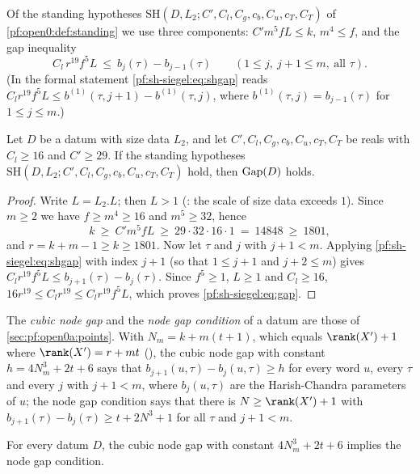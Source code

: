 Of the standing hypotheses $\mathrm{SH}(D,L_2;C',C_l,C_g,c_b,C_u,c_T,C_T)$ of \cref{pf:open0:def:standing} we use three
components: $C'm^5fL\le k$, $m^4\le f$, and the gap inequality
\begin{equation}\label{pf:sh-siegel:eq:shgap}
C_l\,r^{19}f^5L\ \le\ b_{j}(\tau)-b_{j-1}(\tau)\qquad(1\le j,\ j+1\le m,\ \text{all }\tau).
\end{equation}
(In the formal statement \eqref{pf:sh-siegel:eq:shgap} reads $C_lr^{19}f^5L\le b^{(1)}(\tau,j+1)-b^{(1)}(\tau,j)$, where
$b^{(1)}(\tau,j)=b_{j-1}(\tau)$ for $1\le j\le m$.)

\begin{proposition}\label{pf:sh-siegel:gaphyp}
Let $D$ be a datum with size data $L_2$, and let $C',C_l,C_g,c_b,C_u,c_T,C_T$ be reals with $C_l\ge16$ and $C'\ge29$. If
the standing hypotheses $\mathrm{SH}(D,L_2;C',C_l,C_g,c_b,C_u,c_T,C_T)$ hold, then $\mathrm{Gap}(D)$ holds.
\end{proposition}

\begin{proof}
Write $L=L_2.L$; then $L>1$ (: the scale of size data exceeds $1$). Since
$m\ge2$ we have $f\ge m^4\ge16$ and $m^5\ge32$, hence
\[
k\ \ge\ C'm^5fL\ \ge\ 29\cdot32\cdot16\cdot1\ =\ 14848\ \ge\ 1801,
\]
and $r=k+m-1\ge k\ge1801$. Now let $\tau$ and $j$ with $j+1<m$. Applying \eqref{pf:sh-siegel:eq:shgap} with index
$j+1$ (so that $1\le j+1$ and $j+2\le m$) gives $C_lr^{19}f^5L\le b_{j+1}(\tau)-b_j(\tau)$. Since $f^5\ge1$, $L\ge1$ and
$C_l\ge16$, $16r^{19}\le C_lr^{19}\le C_lr^{19}f^5L$, which proves \eqref{pf:sh-siegel:eq:gap}.
\end{proof}

The \emph{cubic node gap} and the \emph{node gap condition} of a datum are those of \cref{sec:pf:open0a:points}. With
$N_m=k+m(t+1)$, which equals $\rank(X')+1$ where $\rank(X')=r+mt$ (), the
cubic node gap with constant $h=4N_m^3+2t+6$ says that $b_{j+1}(u,\tau)-b_j(u,\tau)\ge h$ for every word $u$, every
$\tau$ and every $j$ with $j+1<m$, where $b_j(u,\tau)$ are the Harish-Chandra parameters of $u$; the node gap condition
says that there is $N\ge\rank(X')+1$ with $b_{j+1}(\tau)-b_j(\tau)\ge t+2N^3+1$ for all $\tau$ and $j+1<m$.

\begin{lemma}\label{pf:sh-siegel:nodegap}
For every datum $D$, the cubic node gap with constant $4N_m^3+2t+6$ implies the node gap condition.
\end{lemma}


